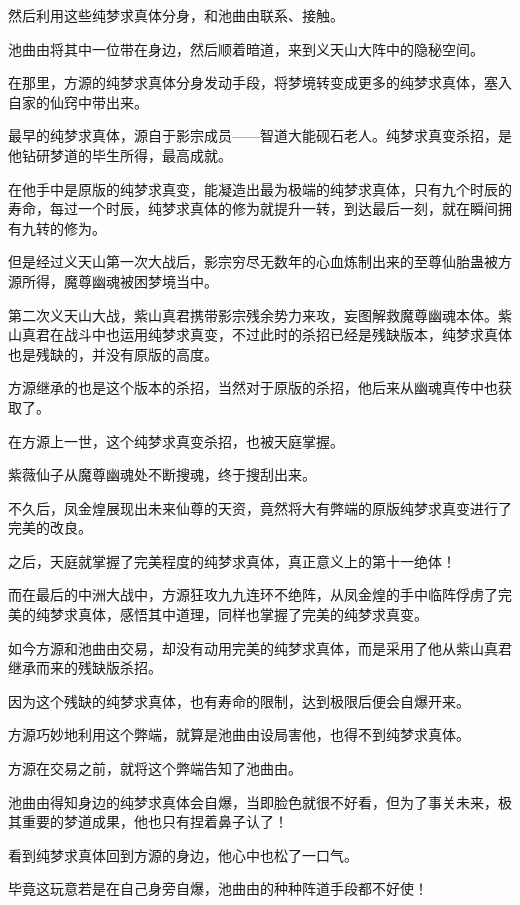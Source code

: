 \begin{this_body}
然后利用这些纯梦求真体分身，和池曲由联系、接触。

池曲由将其中一位带在身边，然后顺着暗道，来到义天山大阵中的隐秘空间。

在那里，方源的纯梦求真体分身发动手段，将梦境转变成更多的纯梦求真体，塞入自家的仙窍中带出来。

最早的纯梦求真体，源自于影宗成员——智道大能砚石老人。纯梦求真变杀招，是他钻研梦道的毕生所得，最高成就。

在他手中是原版的纯梦求真变，能凝造出最为极端的纯梦求真体，只有九个时辰的寿命，每过一个时辰，纯梦求真体的修为就提升一转，到达最后一刻，就在瞬间拥有九转的修为。

但是经过义天山第一次大战后，影宗穷尽无数年的心血炼制出来的至尊仙胎蛊被方源所得，魔尊幽魂被困梦境当中。

第二次义天山大战，紫山真君携带影宗残余势力来攻，妄图解救魔尊幽魂本体。紫山真君在战斗中也运用纯梦求真变，不过此时的杀招已经是残缺版本，纯梦求真体也是残缺的，并没有原版的高度。

方源继承的也是这个版本的杀招，当然对于原版的杀招，他后来从幽魂真传中也获取了。

在方源上一世，这个纯梦求真变杀招，也被天庭掌握。

紫薇仙子从魔尊幽魂处不断搜魂，终于搜刮出来。

不久后，凤金煌展现出未来仙尊的天资，竟然将大有弊端的原版纯梦求真变进行了完美的改良。

之后，天庭就掌握了完美程度的纯梦求真体，真正意义上的第十一绝体！

而在最后的中洲大战中，方源狂攻九九连环不绝阵，从凤金煌的手中临阵俘虏了完美的纯梦求真体，感悟其中道理，同样也掌握了完美的纯梦求真变。

如今方源和池曲由交易，却没有动用完美的纯梦求真体，而是采用了他从紫山真君继承而来的残缺版杀招。

因为这个残缺的纯梦求真体，也有寿命的限制，达到极限后便会自爆开来。

方源巧妙地利用这个弊端，就算是池曲由设局害他，也得不到纯梦求真体。

方源在交易之前，就将这个弊端告知了池曲由。

池曲由得知身边的纯梦求真体会自爆，当即脸色就很不好看，但为了事关未来，极其重要的梦道成果，他也只有捏着鼻子认了！

看到纯梦求真体回到方源的身边，他心中也松了一口气。

毕竟这玩意若是在自己身旁自爆，池曲由的种种阵道手段都不好使！


\end{this_body}
